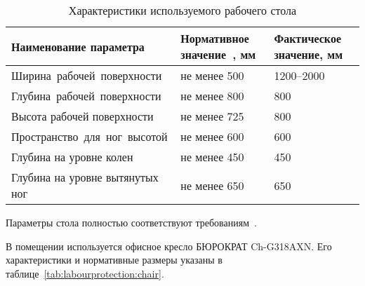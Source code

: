\begin{table}[h]
\caption{Характеристики используемого рабочего стола}
\label{tab:labourprotection:desktop}
\nohyphenation

\begin{tabular}{|C{225.9pt}|C{125.05pt}|C{114.85pt}|}
\hline
Наименование параметра & Нормативное значение~\cite{SanPin2_2_2}, мм & Фактическое значение, мм \\
\hline
Ширина рабочей поверхности & не менее 500  & 1200--2000 \\
\hline
Глубина рабочей поверхности & не менее 800 & 800 \\
\hline
Высота рабочей поверхности & не менее 725 & 800 \\
\hline
Пространство для ног высотой & не менее 600 & 600 \\
\hline
Глубина на уровне колен & не менее 450 & 450 \\
\hline
Глубина на уровне вытянутых ног & не менее 650 & 650 \\
\hline
\end{tabular}
\end{table}

Параметры стола полностью соответствуют требованиям~\cite{SanPin2_2_2}.

В помещении используется офисное кресло БЮРОКРАТ Ch-G318AXN. Его характеристики и нормативные размеры указаны в таблице~\ref{tab:labourprotection:chair}.

